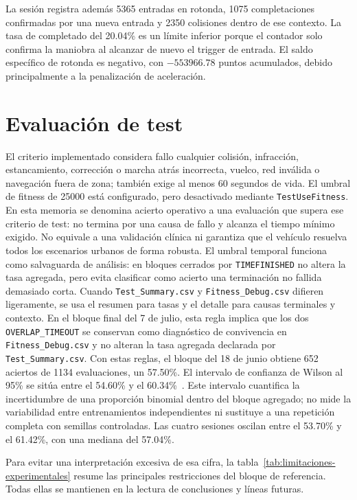 La sesión registra además 5365 entradas en rotonda, 1075 completaciones confirmadas por una nueva entrada y 2350 colisiones dentro de ese contexto. La tasa de completado del 20.04\% es un límite inferior porque el contador solo confirma la maniobra al alcanzar de nuevo el trigger de entrada. El saldo específico de rotonda es negativo, con \(-553966{.}78\) puntos acumulados, debido principalmente a la penalización de aceleración.

\section{Evaluación de test}

El criterio implementado considera fallo cualquier colisión, infracción, estancamiento, corrección o marcha atrás incorrecta, vuelco, red inválida o navegación fuera de zona; también exige al menos 60 segundos de vida. El umbral de fitness de 25000 está configurado, pero desactivado mediante \texttt{TestUseFitness}. En esta memoria se denomina acierto operativo a una evaluación que supera ese criterio de test: no termina por una causa de fallo y alcanza el tiempo mínimo exigido. No equivale a una validación clínica ni garantiza que el vehículo resuelva todos los escenarios urbanos de forma robusta. El umbral temporal funciona como salvaguarda de análisis: en bloques cerrados por \texttt{TIMEFINISHED} no altera la tasa agregada, pero evita clasificar como acierto una terminación no fallida demasiado corta. Cuando \texttt{Test\_Summary.csv} y \texttt{Fitness\_Debug.csv} difieren ligeramente, se usa el resumen para tasas y el detalle para causas terminales y contexto. En el bloque final del 7 de julio, esta regla implica que los dos \texttt{OVERLAP\_TIMEOUT} se conservan como diagnóstico de convivencia en \texttt{Fitness\_Debug.csv} y no alteran la tasa agregada declarada por \texttt{Test\_Summary.csv}. Con estas reglas, el bloque del 18 de junio obtiene 652 aciertos de 1134 evaluaciones, un 57.50\%. El intervalo de confianza de Wilson al 95\% se sitúa entre el 54.60\% y el 60.34\%~\cite{wilson}. Este intervalo cuantifica la incertidumbre de una proporción binomial dentro del bloque agregado; no mide la variabilidad entre entrenamientos independientes ni sustituye a una repetición completa con semillas controladas. Las cuatro sesiones oscilan entre el 53.70\% y el 61.42\%, con una mediana del 57.04\%.

Para evitar una interpretación excesiva de esa cifra, la tabla~\ref{tab:limitaciones-experimentales} resume las principales restricciones del bloque de referencia. Todas ellas se mantienen en la lectura de conclusiones y líneas futuras.

